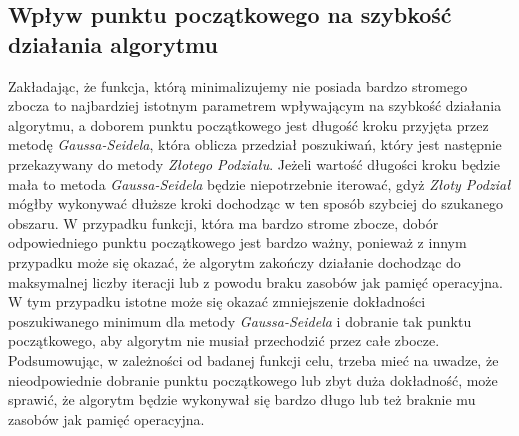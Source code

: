 \documentclass[a4paper,12pt]{article}
\begin{document}
\subsection{Wpływ punktu początkowego na szybkość działania algorytmu}
Zakładając, że funkcja, którą minimalizujemy nie posiada bardzo stromego zbocza to najbardziej istotnym parametrem wpływającym na szybkość działania algorytmu, a doborem punktu początkowego jest długość kroku przyjęta przez metodę \textit{Gaussa-Seidela}, która oblicza przedział poszukiwań, który jest następnie przekazywany do metody \textit{Złotego Podziału}. Jeżeli wartość długości kroku będzie mała to metoda \textit{Gaussa-Seidela} będzie niepotrzebnie iterować, gdyż \textit{Złoty Podział} mógłby wykonywać dłuższe kroki dochodząc w ten sposób szybciej do szukanego obszaru. W przypadku funkcji, która ma bardzo strome zbocze, dobór odpowiedniego punktu początkowego jest bardzo ważny, ponieważ z innym przypadku może się okazać, że algorytm zakończy działanie dochodząc do maksymalnej liczby iteracji lub z powodu braku zasobów jak pamięć operacyjna. W tym przypadku istotne może się okazać zmniejszenie dokładności poszukiwanego minimum dla metody \textit{Gaussa-Seidela} i dobranie tak punktu początkowego, aby algorytm nie musiał przechodzić przez całe zbocze. Podsumowując, w zależności od badanej funkcji celu, trzeba mieć na uwadze, że nieodpowiednie dobranie punktu początkowego lub zbyt duża dokładność, może sprawić, że algorytm będzie wykonywał się bardzo długo lub też braknie mu zasobów jak pamięć operacyjna.

\newpage
\end{document}
